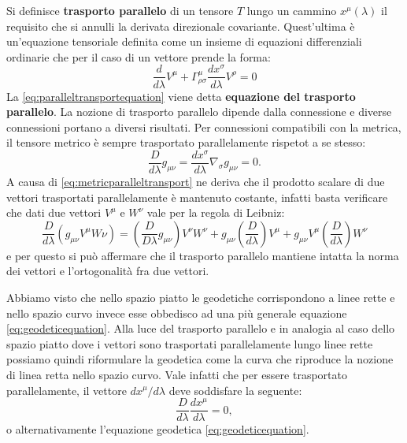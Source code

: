 \documentclass[twoside]{article}
\begin{document}
Si definisce \textbf{trasporto parallelo} di un tensore $T$ lungo un cammino $x^{\mu}(\lambda)$ il requisito che si annulli la derivata direzionale covariante.
Quest'ultima è un'equazione tensoriale definita come un insieme di equazioni differenziali ordinarie che per il caso di un vettore prende la forma:
\begin{equation}\label{eq:paralleltransportequation}
	\frac{d}{d\lambda}V^{\mu } + \Gamma^{\mu}_{\rho \sigma}\frac{dx^\sigma}{d\lambda}V^{\rho}=0
\end{equation}
La \ref{eq:paralleltransportequation} viene detta \textbf{equazione del trasporto parallelo}. La nozione di trasporto parallelo dipende dalla connessione e diverse connessioni portano a diversi risultati. Per connessioni compatibili con la metrica, il tensore metrico è sempre trasportato parallelamente rispetot a se stesso:
\begin{equation}\label{eq:metricparalleltransport}
\frac{D}{ d\lambda}g_{\mu \nu} = \frac{dx^\sigma}{d\lambda}\nabla_{\sigma}g_{\mu \nu}=0.
\end{equation}
A causa di \ref{eq:metricparalleltransport} ne deriva che il prodotto scalare di due vettori trasportati parallelamente è mantenuto costante, infatti basta verificare che dati due vettori $V^\mu$ e $W^\nu$ vale per la regola di Leibniz:
\begin{equation}
	\frac{D}{ d\lambda} (g_{\mu \nu}V^\mu W\nu ) = \left( \frac{D}{D \lambda}g_{\mu \nu}\right ) V^{\nu}W^{\nu} + g_{\mu \nu} \left( \frac{D}{d\lambda} \right) V^\mu 
	 + g_{\mu \nu}V^\mu \left( \frac{D}{d \lambda }\right) W^\nu 
\end{equation}
e per questo si può affermare che il trasporto parallelo mantiene intatta la norma dei vettori e l'ortogonalità fra due vettori.

Abbiamo visto che nello spazio piatto le geodetiche corrispondono a linee rette e nello spazio curvo invece esse obbedisco ad una più generale equazione \ref{eq:geodeticequation}. Alla luce del trasporto parallelo e in analogia al caso dello spazio piatto dove i vettori sono trasportati parallelamente lungo linee rette possiamo quindi riformulare la geodetica come la curva che riproduce la nozione di linea retta nello spazio curvo. Vale infatti che per essere trasportato parallelamente, il vettore $dx^\mu/d\lambda$ deve soddisfare la seguente:
\begin{equation}
	\frac{D}{d \lambda} \frac{dx^\mu}{d\lambda} = 0,
\end{equation}
o alternativamente l'equazione geodetica \ref{eq:geodeticequation}.
\end{document}

